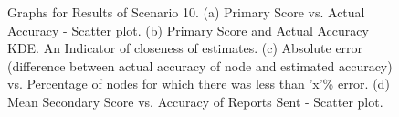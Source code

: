 \documentclass[journal]{IEEEtran}
\begin{document}
\begin{figure}[!ht]
{	}
\end{figure}
\begin{figure}[!ht]
	\caption{Graphs for Results of Scenario 10. (a) Primary Score vs. Actual Accuracy - Scatter plot. (b) Primary Score and Actual Accuracy KDE. An Indicator of closeness of estimates. (c) Absolute error (difference between actual accuracy of node and estimated accuracy) vs. Percentage of nodes for which there was less than 'x'\% error. (d) Mean Secondary Score vs. Accuracy of Reports Sent - Scatter plot.}
	\label{fig:apdx:sc10}
	\centering
\end{figure}
\end{document}

